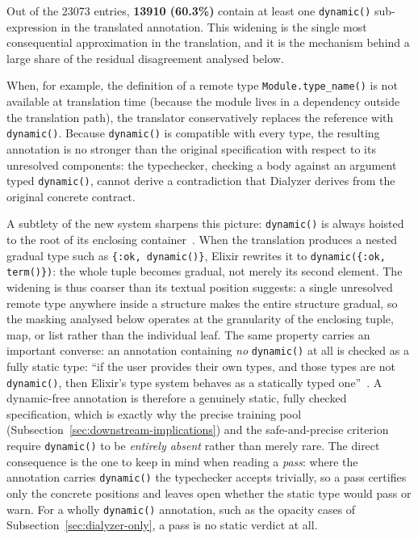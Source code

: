 Out of the \num{23073} entries, \textbf{\num{13910} (60.3\%)} contain at least one \texttt{dynamic()} sub-expression in the translated annotation.
This widening is the single most consequential approximation in the translation, and it is the mechanism behind a large share of the residual disagreement analysed below.

When, for example, the definition of a remote type \texttt{Module.type\_name()} is not available at translation time (because the module lives in a dependency outside the translation path), the translator conservatively replaces the reference with \texttt{dynamic()}.
Because \texttt{dynamic()} is compatible with every type, the resulting annotation is no stronger than the original specification with respect to its unresolved components: the typechecker, checking a body against an argument typed \texttt{dynamic()}, cannot derive a contradiction that Dialyzer derives from the original concrete contract.

A subtlety of the new system sharpens this picture: \texttt{dynamic()} is always hoisted to the root of its enclosing container~\cite{elixir-set-theoretic-types}.
When the translation produces a nested gradual type such as \texttt{\{:ok, dynamic()\}}, Elixir rewrites it to \texttt{dynamic(\{:ok, term()\})}: the whole tuple becomes gradual, not merely its second element.
The widening is thus coarser than its textual position suggests: a single unresolved remote type anywhere inside a structure makes the entire structure gradual, so the masking analysed below operates at the granularity of the enclosing tuple, map, or list rather than the individual leaf.
The same property carries an important converse: an annotation containing \emph{no} \texttt{dynamic()} at all is checked as a fully static type: ``if the user provides their own types, and those types are not \texttt{dynamic()}, then Elixir's type system behaves as a statically typed one''~\cite{elixir-set-theoretic-types}.
A dynamic-free annotation is therefore a genuinely static, fully checked specification, which is exactly why the precise training pool (Subsection~\ref{sec:downstream-implications}) and the safe-and-precise criterion require \texttt{dynamic()} to be \emph{entirely absent} rather than merely rare.
The direct consequence is the one to keep in mind when reading a \emph{pass}: where the annotation carries \texttt{dynamic()} the typechecker accepts trivially, so a pass certifies only the concrete positions and leaves open whether the static type would pass or warn. For a wholly \texttt{dynamic()} annotation, such as the opacity cases of Subsection~\ref{sec:dialyzer-only}, a pass is no static verdict at all.

